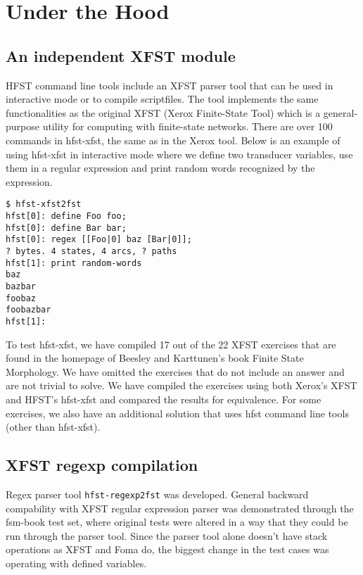 \documentclass{llncs}
\begin{document}
\section{Under the Hood}

\subsection{An independent XFST module}

HFST command line tools include an XFST parser tool that can be used
in interactive mode or to compile scriptfiles. The tool implements the
same functionalities as the original XFST (Xerox Finite-State Tool)
which is a general-purpose utility for computing with finite-state
networks. There are over 100 commands in hfst-xfst, the same as in the
Xerox tool. Below is an example of using hfst-xfst in interactive mode
where we define two transducer variables, use them in a regular
expression and print random words recognized by the expression.

\begin{verbatim}
$ hfst-xfst2fst 
hfst[0]: define Foo foo;
hfst[0]: define Bar bar;
hfst[0]: regex [[Foo|0] baz [Bar|0]];
? bytes. 4 states, 4 arcs, ? paths
hfst[1]: print random-words
baz
bazbar
foobaz
foobazbar
hfst[1]: 
\end{verbatim}

To test hfst-xfst, we have compiled 17 out of the 22 XFST exercises
that are found in the homepage of Beesley and Karttunen's book Finite
State Morphology. We have omitted the exercises that do not include an
answer and are not trivial to solve. We have compiled the exercises
using both Xerox's XFST and HFST's hfst-xfst and compared the results
for equivalence. For some exercises, we also have an additional
solution that uses hfst command line tools (other than hfst-xfst).

\subsection{XFST regexp compilation}

Regex parser tool \verb+hfst-regexp2fst+ was developed. General backward
compability with XFST regular expression parser was demonstrated through the
fsm-book test set, where original tests were altered in a way that they could be
run through the parser tool. Since the parser tool alone doesn't have stack
operations as XFST and Foma do, the biggest change in the test cases was
operating with defined variables.
\end{document}
